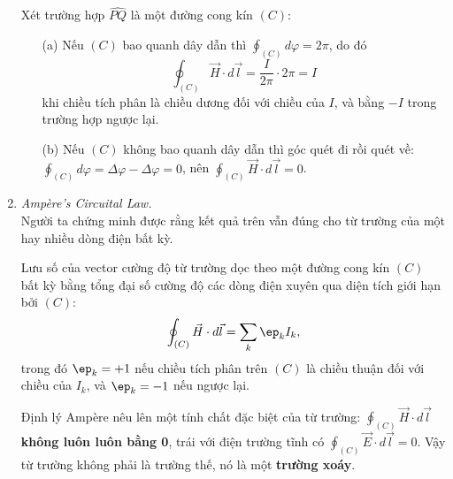 \begin{enumerate}
Xét trường hợp $\widehat{PQ}$ là một đường cong kín $(C)$:
\begin{enumerate}
  \item[(a)] Nếu $(C)$ bao quanh dây dẫn thì $\oint_{(C)} d\varphi = 2\pi$, do đó
  \[
  \oint_{(C)} \vec{H}\cdot d\vec{l} = \frac{I}{2\pi}\cdot 2\pi = I
  \]
  khi chiều tích phân là chiều dương đối với chiều của $I$, và bằng $-I$ trong trường hợp ngược lại.
  \item[(b)] Nếu $(C)$ không bao quanh dây dẫn thì góc quét đi rồi quét về: $\oint_{(C)} d\varphi = \Delta\varphi - \Delta\varphi = 0$, nên $\oint_{(C)} \vec{H}\cdot d\vec{l} = 0$.
\end{enumerate}

\item \textit{Ampère's Circuital Law.}\\
Người ta chứng minh được rằng kết quả trên vẫn đúng cho từ trường của một hay nhiều dòng điện bất kỳ.
\begin{theorem}[Ampère]
Lưu số của vector cường độ từ trường dọc theo một đường cong kín $(C)$ bất kỳ bằng tổng đại số cường độ các dòng điện xuyên qua diện tích giới hạn bởi $(C)$:
\[
\oint_{(C)} \vec{H}\cdot d\vec{l} = \sum_k \ep_k I_k,
\]
trong đó $\ep_k = +1$ nếu chiều tích phân trên $(C)$ là chiều thuận đối với chiều của $I_k$, và $\ep_k = -1$ nếu ngược lại.
\end{theorem}
Định lý Ampère nêu lên một tính chất đặc biệt của từ trường: $\oint_{(C)} \vec{H}\cdot d\vec{l}$ \textbf{không luôn luôn bằng 0}, trái với điện trường tĩnh có $\oint_{(C)} \vec{E}\cdot d\vec{l} = 0$. Vậy từ trường không phải là trường thế, nó là một \textbf{trường xoáy}.
\end{enumerate}

